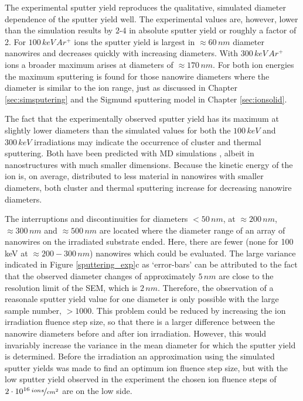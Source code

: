 The experimental sputter yield reproduces the qualitative, simulated diameter dependence of the sputter yield well. The experimental values are, however, lower than the simulation results by $2$-$4$ in absolute sputter yield or roughly a factor of 2. For $100\,keV\,Ar^+$ ions the sputter yield is largest in $\approx 60\,nm$ diameter nanowires and decreases quickly with increasing diameters. With $300\,keV\,Ar^+$ ions a broader maximum arises at diameters of $\approx 170\,nm$. For both ion energies the maximum sputtering is found for those nanowire diameters where the diameter is similar to the ion range, just as discussed in Chapter \ref{sec:simsputering} and the Sigmund sputtering model in Chapter \ref{sec:ionsolid}.   

The fact that the experimentally observed sputter yield has its maximum at slightly lower diameters than the simulated values for both the $100\,keV$ and $300\,keV$ irradiations may indicate the occurrence of cluster and thermal sputtering. Both have been predicted with MD simulations \cite{nietiadi_sputtering_2014,urbassek_sputter_2015,anders_sputtering_2015}, albeit in nanostructures with much smaller dimensions. Because the kinetic energy of the ion is, on average, distributed to less material in nanowires with smaller diameters, both cluster and thermal sputtering increase for decreasing nanowire diameters.

The interruptions and discontinuities for diameters $<50\,nm$, at $\approx 200\,nm$, $\approx 300\,nm$ and $\approx 500\,nm$ are located where the diameter range of an array of nanowires on the irradiated substrate ended. Here, there are fewer (none for 100\,keV at $\approx 200 - 300\,nm$) nanowires which could be evaluated. The large variance indicated in Figure \ref{sputtering_exp}c as `error-bars' can be attributed to the fact that the observed diameter changes of approximately $5\,nm$ are close to the resolution limit of the SEM, which is $2\,nm$. Therefore, the observation of a reasonale sputter yield value for one diameter is only possible with the large sample number, $>1000$. This problem could be reduced by increasing the ion irradiation fluence step size, so that there is a larger difference between the nanowire diameters before and after ion irradiation. However, this would invariably increase the variance in the mean diameter for which the sputter yield is determined. Before the irradiation an approximation using the simulated sputter yields was made to find an optimum ion fluence step size, but with the low sputter yield observed in the experiment the chosen ion fluence steps of $2\cdot10^{16}\,\nicefrac{ions}{cm^2}$ are on the low side.

